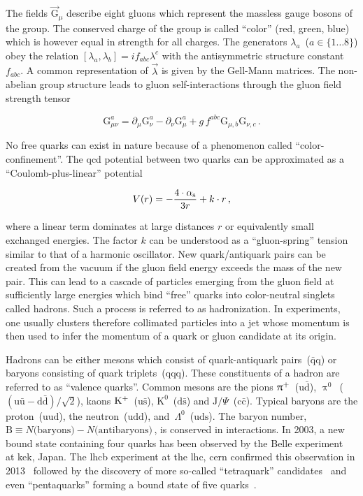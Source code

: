 The fields $\vec{\mathrm{G}}_\mu$ describe eight gluons which represent the massless gauge bosons of the group. The conserved charge of the group is called ``color'' (red, green, blue) which is however equal in strength for all charges. The generators $\lambda_a$~($a\in\{1\ldots8\}$) obey the relation $[\lambda_a,\lambda_b]=if_{abc}\lambda^c$ with the antisymmetric structure constant $f_{abc}$. A common representation of $\vec{\lambda}$ is given by the Gell-Mann matrices. The non-abelian group structure leads to gluon self-interactions through the gluon field strength tensor

\begin{equation}
\mathrm{G}_{\mu\nu}^{a}=\partial_{\mu} \mathrm{G}_\nu^{a}-\partial_{\nu} \mathrm{G}_{\mu}^{a}+g\,f^{abc}\mathrm{G}_{\mu,b}\mathrm{G}_{\nu,c}\,.
\end{equation}

No free quarks can exist in nature because of a phenomenon called ``color-confinement''. The \gls{qcd} potential between two quarks can be approximated as a ``Coulomb-plus-linear'' potential~\cite{Sumino2003173}

\begin{equation}
V(r)=-\frac{4\cdot{\alpha_\textrm{s}}}{3r}+k\cdot r\,,
\end{equation}

where a linear term dominates at large distances $r$ or equivalently small exchanged energies. The factor $k$ can be understood as a ``gluon-spring'' tension similar to that of a harmonic oscillator. New quark/antiquark pairs can be created from the vacuum if the gluon field energy exceeds the mass of the new pair. This can lead to a cascade of particles emerging from the gluon field at sufficiently large energies which bind ``free'' quarks into color-neutral singlets called hadrons. Such a process is referred to as hadronization. In experiments, one usually clusters therefore collimated particles into a jet whose momentum is then used to infer the momentum of a quark or gluon candidate at its origin.

Hadrons can be either mesons which consist of quark-antiquark pairs~($\bar{\mathrm{q}}\mathrm{q}$) or baryons consisting of quark triplets~($\mathrm{qqq}$). These constituents of a hadron are referred to as ``valence quarks''. Common mesons are the pions $\uppi^{+}$~($\mathrm{u}\bar{\mathrm{d}}$), $\uppi^{0}$~($(\mathrm{u}\bar{\mathrm{u}}-\mathrm{d}\bar{\mathrm{d}})/\sqrt{2}$), kaons $\mathrm{K}^{+}$~($\mathrm{u}\bar{\mathrm{s}}$), $\mathrm{K}^{0}$~($\mathrm{d}\bar{\mathrm{s}}$) and $\mathrm{J}/\Psi$~($\mathrm{c}\bar{\mathrm{c}}$). Typical baryons are the proton~($\mathrm{uud}$), the neutron~($\mathrm{udd}$), and~$\Lambda^{0}$~($\mathrm{uds}$). The baryon number, $\mathrm{B}\equiv N\text{(baryons)}-N\text{(antibaryons)}\,$, is conserved in interactions. In 2003, a new bound state containing four quarks has been observed by the Belle experiment~\cite{PhysRevLett.91.262001} at \gls{kek}, Japan. The \gls{lhcb} experiment at the \gls{lhc}, \gls{cern} confirmed this observation in 2013~\cite{Aaij:2013zoa} followed by the discovery of more so-called ``tetraquark'' candidates~\cite{Aaij:2014jqa,Aaij:2016iza} and even ``pentaquarks'' forming a bound state of five quarks~\cite{Aaij:2015tga}.

